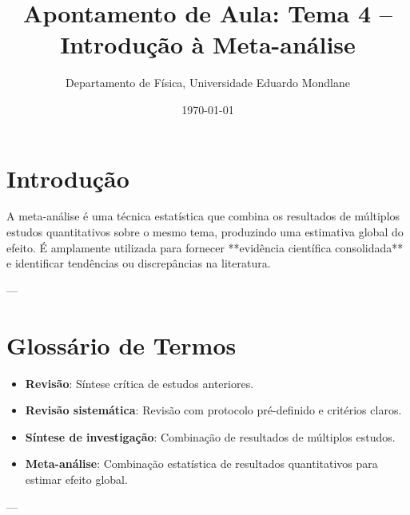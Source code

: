 \documentclass[12pt,a4paper]{article}
\title{Apontamento de Aula: Tema 4 – Introdução à Meta-análise}
\author{Departamento de Física, Universidade Eduardo Mondlane}
\date{\today}
\begin{document}
\maketitle

\tableofcontents
\newpage

\section*{Introdução}
A meta-análise é uma técnica estatística que combina os resultados de múltiplos estudos quantitativos sobre o mesmo tema, produzindo uma estimativa global do efeito. É amplamente utilizada para fornecer **evidência científica consolidada** e identificar tendências ou discrepâncias na literatura.

---

\section{Glossário de Termos}
\begin{itemize}
    \item \textbf{Revisão}: Síntese crítica de estudos anteriores.
    \item \textbf{Revisão sistemática}: Revisão com protocolo pré-definido e critérios claros.
    \item \textbf{Síntese de investigação}: Combinação de resultados de múltiplos estudos.
    \item \textbf{Meta-análise}: Combinação estatística de resultados quantitativos para estimar efeito global.
\end{itemize}

---
\end{document}
